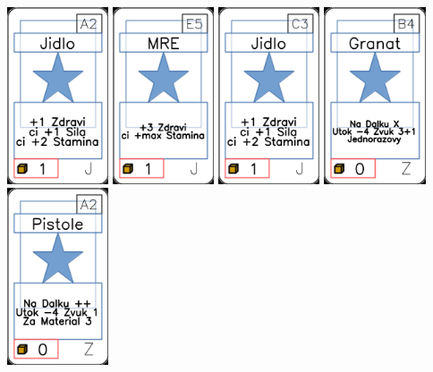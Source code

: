 \documentclass[a4paper]{article}
\begin{document}
	\includegraphics[width=3.0cm]{img-1_1}
	\includegraphics[width=3.0cm]{img-1_24}
	\includegraphics[width=3.0cm]{img-1_12}
	\includegraphics[width=3.0cm]{img-1_98}
	\includegraphics[width=3.0cm]{img-1_91}
\end{document}
